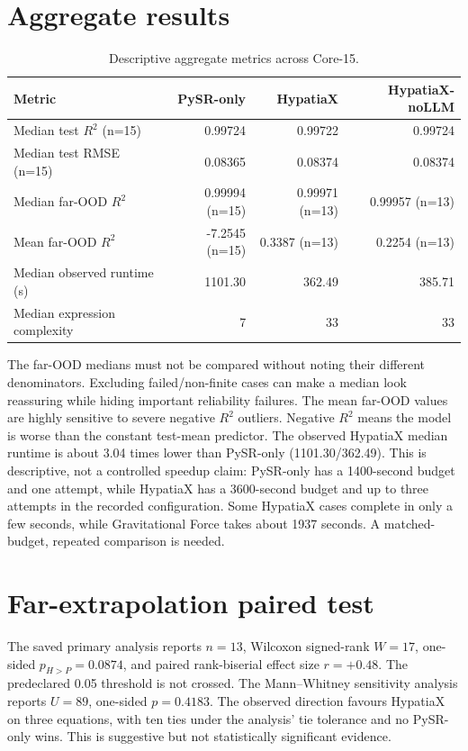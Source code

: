 \documentclass[11pt,a4paper]{article}
\begin{document}
\section{Aggregate results}
\begin{table}[ht]
\centering
\caption{Descriptive aggregate metrics across Core-15.}
\begin{tabular}{lrrr}
\toprule
Metric & PySR-only & HypatiaX & HypatiaX-noLLM\\
\midrule
Median test $R^2$ (n=15) & 0.99724 & 0.99722 & 0.99724\\
Median test RMSE (n=15) & 0.08365 & 0.08374 & 0.08374\\
Median far-OOD $R^2$ & 0.99994 (n=15) & 0.99971 (n=13) & 0.99957 (n=13)\\
Mean far-OOD $R^2$ & -7.2545 (n=15) & 0.3387 (n=13) & 0.2254 (n=13)\\
Median observed runtime (s) & 1101.30 & 362.49 & 385.71\\
Median expression complexity & 7 & 33 & 33\\
\bottomrule
\end{tabular}
\end{table}
The far-OOD medians must not be compared without noting their different
denominators. Excluding failed/non-finite cases can make a median look
reassuring while hiding important reliability failures. The mean far-OOD
values are highly sensitive to severe negative $R^2$ outliers.
Negative $R^2$ means the model is worse than the constant test-mean predictor.
The observed HypatiaX median runtime is about 3.04 times lower than PySR-only
(1101.30/362.49). This is descriptive, not a controlled speedup claim:
PySR-only has a 1400-second budget and one attempt, while HypatiaX has a
3600-second budget and up to three attempts in the recorded configuration.
Some HypatiaX cases complete in only a few seconds, while Gravitational Force
takes about 1937 seconds. A matched-budget, repeated comparison is needed.
\section{Far-extrapolation paired test}
The saved primary analysis reports $n=13$, Wilcoxon signed-rank
$W=17$, one-sided $p_{H>P}=0.0874$, and paired rank-biserial effect size
$r=+0.48$. The predeclared 0.05 threshold is not crossed. The Mann--Whitney
sensitivity analysis reports $U=89$, one-sided $p=0.4183$.
The observed direction favours HypatiaX on three equations, with ten ties
under the analysis' tie tolerance and no PySR-only wins. This is suggestive
but not statistically significant evidence.
\end{document}
